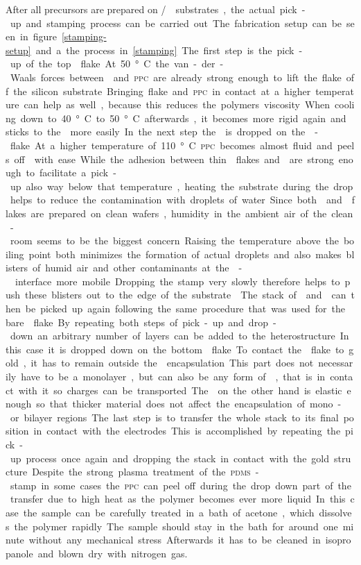 After all precursors are prepared on \si/\sio substrates, the actual pick-up and stamping process can be carried out. The fabrication setup can be seen in figure \ref{stamping-setup} and a the process in \ref{stamping}. The first step is the pick-up of the top \hbng flake. At 50°C the van-der-Waals forces between \hbng and \textsc{ppc} are already strong enough to lift the flake off the silicon substrate. Bringing flake and \textsc{ppc} in contact at a higher temperature can help as well, because this reduces the polymers viscosity. When cooling down to 40°C to 50°C afterwards, it becomes more rigid again and sticks to the \hbng more easily. In the next step the \hbng is dropped on the \tmd-flake. At a higher temperature of 110°C \textsc{ppc} becomes almost fluid and peels off \hbng with ease. While the adhesion between thin \tmdg flakes and \hbng are strong enough to facilitate a pick-up also way below that temperature, heating the substrate during the drop helps to reduce the contamination with droplets of water. Since both \tmdg and \hbng flakes are prepared on clean wafers, humidity in the ambient air of the clean-room seems to be the biggest concern. Raising the temperature above the boiling point both minimizes the formation of actual droplets and also makes blisters of humid air and other contaminants at the \hbn-\tmdg interface more mobile. Dropping the stamp very slowly therefore helps to push these blisters out to the edge of the substrate \cite{pizzocchero_hot_2016}. The stack of \tmdg and \hbng can then be picked up again following the same procedure that was used for the bare \hbng flake. By repeating both steps of pick-up and drop-down an arbitrary number of layers can be added to the heterostructure. In this case it is dropped down on the bottom \hbng flake. To contact the \tmdg flake to gold, it has to remain outside the \hbng encapsulation. This part does not necessarily have to be a monolayer, but can also be any form of \tmdg, that is in contact with it so charges can be transported. The \hbng on the other hand is elastic enough so that thicker material does not affect the encapsulation of mono- or bilayer regions.

The last step is to transfer the whole stack to its final position in contact with the electrodes. This is accomplished by repeating the pick-up process once again and dropping the stack in contact with the gold structure.

Despite the strong plasma treatment of the \textsc{pdms}-stamp in some cases the \textsc{ppc} can peel off during the drop down part of the transfer due to high heat as the polymer becomes ever more liquid. In this case the sample can be carefully treated in a bath of acetone, which dissolves the polymer rapidly. The sample should stay in the bath for around one minute without any mechanical stress. Afterwards it has to be cleaned in isopropanole and blown dry with nitrogen gas. 

